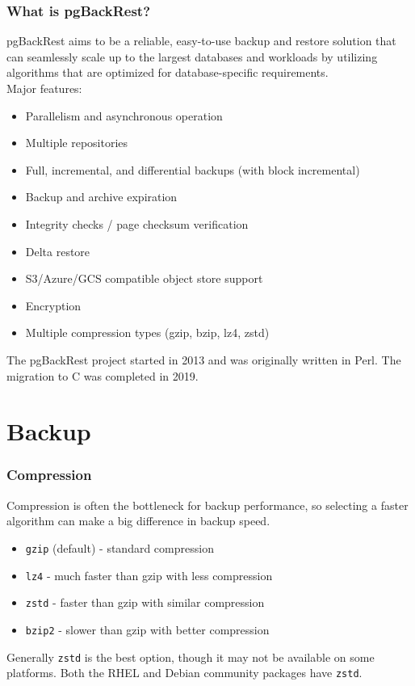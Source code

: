 \begin{frame}[fragile]
    \frametitle{What is pgBackRest?}

    pgBackRest aims to be a reliable, easy-to-use backup and restore solution that can seamlessly scale up to the largest databases and workloads by utilizing algorithms that are optimized for database-specific requirements.
    \\\vspace{1em}
    Major features:

    \begin{itemize}
        \item Parallelism and asynchronous operation
        \item Multiple repositories
        \item Full, incremental, and differential backups (with block incremental)
        \item Backup and archive expiration
        \item Integrity checks / page checksum verification
        \item Delta restore
        \item S3/Azure/GCS compatible object store support
        \item Encryption
        \item Multiple compression types (gzip, bzip, lz4, zstd)
    \end{itemize}

    The pgBackRest project started in 2013 and was originally written in Perl. The migration to C was completed in 2019.
\end{frame}

\section{Backup}

\begin{frame}[fragile]
    \frametitle{Compression}

    Compression is often the bottleneck for backup performance, so selecting a faster algorithm can make a big difference in backup speed.

    \begin{itemize}
        \item \texttt{gzip} (default) - standard compression
        \item \texttt{lz4} - much faster than gzip with less compression
        \item \texttt{zstd} - faster than gzip with similar compression
        \item \texttt{bzip2} - slower than gzip with better compression
    \end{itemize}

    Generally \texttt{zstd} is the best option, though it may not be available on some platforms. Both the RHEL and Debian community packages have \texttt{zstd}.
\end{frame}

